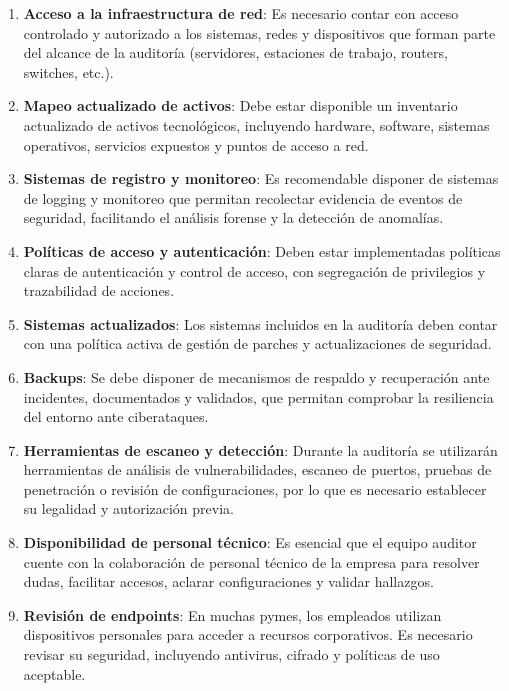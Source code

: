 \documentclass[a4paper, 10pt]{article}
\begin{document}
\begin{enumerate}
    \item \textbf{Acceso a la infraestructura de red}: Es necesario contar con acceso controlado y autorizado a los sistemas, redes y dispositivos que forman parte del alcance de la auditoría (servidores, estaciones de trabajo, routers, switches, etc.).
    
    \item \textbf{Mapeo actualizado de activos}: Debe estar disponible un inventario actualizado de activos tecnológicos, incluyendo hardware, software, sistemas operativos, servicios expuestos y puntos de acceso a red.
    
    \item \textbf{Sistemas de registro y monitoreo}: Es recomendable disponer de sistemas de logging y monitoreo que permitan recolectar evidencia de eventos de seguridad, facilitando el análisis forense y la detección de anomalías.
    
    \item \textbf{Políticas de acceso y autenticación}: Deben estar implementadas políticas claras de autenticación y control de acceso, con segregación de privilegios y trazabilidad de acciones.
    
    \item \textbf{Sistemas actualizados}: Los sistemas incluidos en la auditoría deben contar con una política activa de gestión de parches y actualizaciones de seguridad.
    
    \item \textbf{Backups}: Se debe disponer de mecanismos de respaldo y recuperación ante incidentes, documentados y validados, que permitan comprobar la resiliencia del entorno ante ciberataques.
    
    \item \textbf{Herramientas de escaneo y detección}: Durante la auditoría se utilizarán herramientas de análisis de vulnerabilidades, escaneo de puertos, pruebas de penetración o revisión de configuraciones, por lo que es necesario establecer su legalidad y autorización previa.
    
    \item \textbf{Disponibilidad de personal técnico}: Es esencial que el equipo auditor cuente con la colaboración de personal técnico de la empresa para resolver dudas, facilitar accesos, aclarar configuraciones y validar hallazgos.

    \item \textbf{Revisión de endpoints}: En muchas pymes, los empleados utilizan dispositivos personales para acceder a recursos corporativos. Es necesario revisar su seguridad, incluyendo antivirus, cifrado y políticas de uso aceptable.


\end{enumerate}
\end{document}
